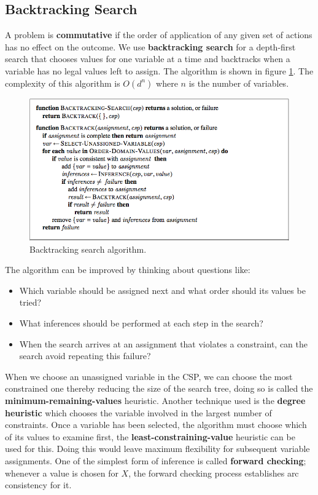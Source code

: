\documentclass[twoside]{article}
\begin{document}
\subsection{Backtracking Search}
A problem is \textbf{commutative} if the order of application of any given
set of actions has no effect on the outcome. We use \textbf{backtracking search}
for a depth-first search that chooses values for one variable at a time and
backtracks when a variable has no legal values left to assign. The algorithm is
shown in figure \ref{fig:backtrack}. The complexity of this algorithm is 
\(O(d^n)\) where \(n\) is the number of variables.
\begin{figure}
  \includegraphics[width=\linewidth]{backtrack.png}
  \caption{Backtracking search algorithm.}
  \label{fig:backtrack}
\end{figure}
The algorithm can be improved by thinking about questions like:
\begin{itemize}
        \item Which variable should be assigned next and what order should
        its values be tried?
        \item What inferences should be performed at each step in the search?
        \item When the search arrives at an assignment that violates a 
        constraint, can the search avoid repeating this failure?
\end{itemize}
When we choose an unassigned variable in the CSP, we can choose the most 
constrained one thereby reducing the size of the search tree, doing so is called
the \textbf{minimum-remaining-values} heuristic. Another technique used is the 
\textbf{degree heuristic} which chooses the variable involved in the largest
 number of constraints. Once a variable has been selected, the algorithm must
 choose which of its values to examine first, the \textbf{least-constraining-value}
 heuristic can be used for this. Doing this would leave maximum flexibility 
 for subsequent variable assignments. One of the simplest form of inference
 is called \textbf{forward checking}; whenever a value is chosen for \(X\),
 the forward checking process establishes arc consistency for it.\\
\end{document}
